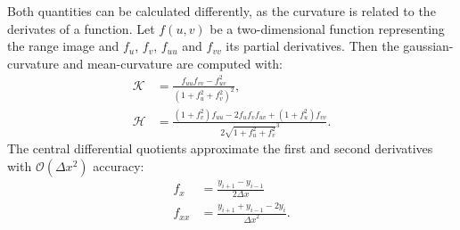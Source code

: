 Both quantities can be calculated differently, as the \gls{curvature} is related to the derivates of a function.
Let $f(u, v)$ be a two-dimensional function representing the range image and $f_u$, $f_v$, $f_{uu}$ and $f_{vv}$ its partial derivatives.
Then the \gls{gaussian-curvature} and \gls{mean-curvature} are computed with:
\begin{equation}
\begin{aligned}
    \mathcal{K} &= \frac{f_{uu} f_{vv} - f_{uv}^2}{{(1 + f_u^2 + f_v^2)}^2}\text{,} \\
    \mathcal{H} &= \frac{{(1 + f_{v}^2)} f_{uu} - 2 f_u f_v f_{uv} + {(1 + f_u^2)} f_{vv}}{2 \sqrt{1 + f_u^2 + f_v^2}^3}\text{.}
\end{aligned}
\end{equation}
The central differential quotients approximate the first and second derivatives with $\mathcal{O}(\Delta x^2)$ accuracy:
\begin{align*}
    f_{x} &= \frac{y_{i+1} - y_{i-1}}{2 \Delta x} \\
    f_{xx} &= \frac{y_{i+1} + y_{i-1} - 2 y_{i}}{{\Delta x}^2}\text{.}
\end{align*}

